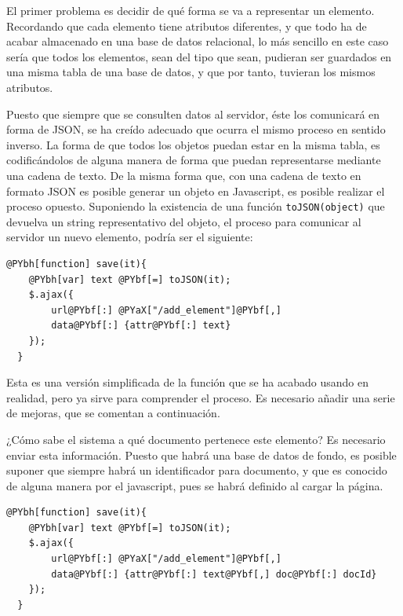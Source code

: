 El primer problema es decidir de qué forma se va a representar un elemento. Recordando que cada elemento tiene atributos diferentes, y que todo ha de acabar almacenado en una base de datos relacional, lo más sencillo en este caso sería que todos los elementos, sean del tipo que sean, pudieran ser guardados en una misma tabla de una base de datos, y que por tanto, tuvieran los mismos atributos.

Puesto que siempre que se consulten datos al servidor, éste los comunicará en forma de JSON, se ha creído adecuado que ocurra el mismo proceso en sentido inverso. La forma de que todos los objetos puedan estar en la misma tabla, es codificándolos de alguna manera de forma que puedan representarse mediante una cadena de texto. De la misma forma que, con una cadena de texto en formato JSON es posible generar un objeto en Javascript, es posible realizar el proceso opuesto. Suponiendo la existencia de una función \texttt{toJSON(object)} que devuelva un string representativo del objeto, el proceso para comunicar al servidor un nuevo elemento, podría ser el siguiente:

\begin{Verbatim}[commandchars=@\[\]]
  @PYbh[function] save(it){
  	@PYbh[var] text @PYbf[=] toJSON(it);
  	$.ajax({
  		url@PYbf[:] @PYaX["/add_element"]@PYbf[,]
  		data@PYbf[:] {attr@PYbf[:] text}
  	});
  }
\end{Verbatim}


Esta es una versión simplificada de la función que se ha acabado usando en realidad, pero ya sirve para comprender el proceso. Es necesario añadir una serie de mejoras, que se comentan a continuación.

¿Cómo sabe el sistema a qué documento pertenece este elemento? Es necesario enviar esta información. Puesto que habrá una base de datos de fondo, es posible suponer que siempre habrá un identificador para documento, y que es conocido de alguna manera por el javascript, pues se habrá definido al cargar la página.

\begin{Verbatim}[commandchars=@\[\]]
  @PYbh[function] save(it){
  	@PYbh[var] text @PYbf[=] toJSON(it);
  	$.ajax({
  		url@PYbf[:] @PYaX["/add_element"]@PYbf[,]
  		data@PYbf[:] {attr@PYbf[:] text@PYbf[,] doc@PYbf[:] docId}
  	});
  }
\end{Verbatim}

